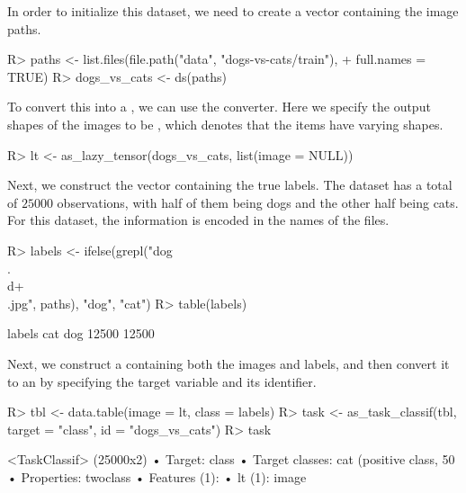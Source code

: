 \documentclass[article]{jss}
\theoremstyle{definition}
\begin{document}

In order to initialize this dataset, we need to create a vector containing the image paths.

\begin{CodeInput}
R> paths <- list.files(file.path("data", "dogs-vs-cats/train"),
+    full.names = TRUE)
R> dogs_vs_cats <- ds(paths)
\end{CodeInput}

To convert this into a , we can use the  converter.
Here we specify the output shapes of the images to be , which denotes that the items have varying shapes.

\begin{CodeInput}
R> lt <- as_lazy_tensor(dogs_vs_cats, list(image = NULL))
\end{CodeInput}

Next, we construct the vector containing the true labels.
The dataset has a total of $25000$ observations, with half of them being dogs and the other half being cats.
For this dataset, the information is encoded in the names of the files.

\begin{CodeInput}
R> labels <- ifelse(grepl("dog\\.\\d+\\.jpg", paths), "dog", "cat")
R> table(labels)
\end{CodeInput}
\begin{CodeOutput}
labels
  cat   dog
12500 12500
\end{CodeOutput}

Next, we construct a  \citep{ref-datatable2024} containing both the images and labels, and then convert it to an  by specifying the target variable and its identifier.

\begin{CodeInput}
R> tbl <- data.table(image = lt, class = labels)
R> task <- as_task_classif(tbl, target = "class", id = "dogs_vs_cats")
R> task
\end{CodeInput}
\begin{CodeOutput}
<TaskClassif> (25000x2)
• Target: class
• Target classes: cat (positive class, 50%
• Properties: twoclass
• Features (1):
  • lt (1): image
\end{CodeOutput}
\end{document}
